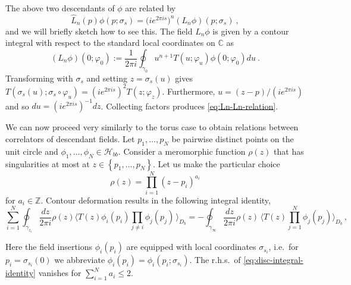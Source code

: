 \documentclass[11pt,a4paper]{article}
\numberwithin{equation}{section}
\begin{document}
The above two descendants of $\phi$ are related by
%
\begin{equation}\label{eq:Ln-Ln-relation}
\widehat{L}_n(p) \phi(p;\sigma_s) = \big( i e^{2 \pi i s} \big)^n (L_n \phi)(p;\sigma_s) ~,
\end{equation}
%
and we will briefly sketch how to see this. The field $L_n \phi$ is given by a contour integral with respect to the standard local coordinates on $\mathbb{C}$ as
\begin{equation}
(L_n \phi)(0;\varphi_0)
:=
\frac{1}{2 \pi i} \oint_{\gamma_0} u^{n+1} T(u;\varphi_u) \phi(0;\varphi_0) du ~.
\end{equation}
Transforming with $\sigma_s$ and setting $z = \sigma_s(u)$ gives $T(\sigma_s(u);\sigma_s \circ \varphi_u) = (i e^{2\pi i s})^2 T(z;\varphi_z)$. Furthermore, $u = (z-p)/(i e^{2 \pi i s})$ and so $du = (i e^{2 \pi i s})^{-1} dz$. Collecting factors produces \eqref{eq:Ln-Ln-relation}.

\medskip

We can now proceed very similarly to the torus case to obtain relations between correlators of descendant fields. Let $p_1,\dots, p_N$ be pairwise distinct points on the unit circle and $\phi_1,\dots,\phi_N \in \mathcal{H}_{bb}$. 
Consider a meromorphic function $\rho(z)$ that has singularities at most at $z\in \left\{p_1,\dots , p_N \right\}$. Let us make the particular choice
%
\begin{equation}
    \rho(z) = \prod_{i=1}^N (z-p_i)^{a_i}
\end{equation}
%
for $a_i\in\mathbb{Z}$. Contour deformation results in the following integral identity,
%
\begin{equation}\label{eq:disc-integral-identity}
    \sum_{i=1}^N \oint_{\gamma_{z_i}} \frac{dz}{2\pi i} \rho(z) \Big\langle T(z) \phi_i(p_i)  \prod_{j\neq i} \phi_j(p_j) 
    \,\Big\rangle_{\!D_b}
    = - \oint_{\gamma_\infty} \frac{dz}{2\pi i} \rho(z) 
    \,\Big\langle T(z) \prod_{j=1}^N \phi_j(p_j) \Big\rangle_{\!D_b}\,,  
\end{equation}

\noindent
Here the field insertions $\phi_i(p_i)$ are equipped with local coordinates $\sigma_{s_i}$, i.e.\ for $p_i = \sigma_{s_i}(0)$ we abbreviate $\phi_i(p_i) = \phi_i(p_i;\sigma_{s_i})$.
The r.h.s.\ of \eqref{eq:disc-integral-identity} vanishes for $\sum_{i=1}^N a_i \le2$. 
\end{document}
